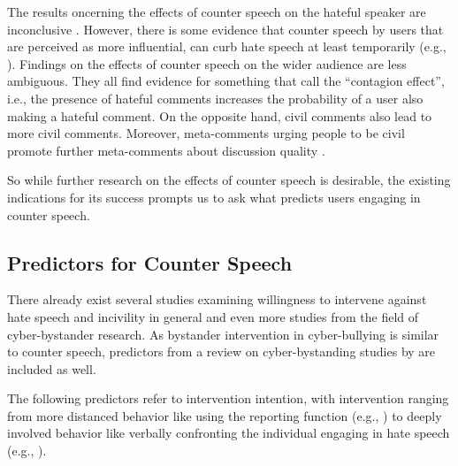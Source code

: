 \documentclass[runningheads]{llncs}
\begin{document}
The results oncerning the effects of counter speech on the hateful speaker are inconclusive \autocite{buergerCounterspeechLiteratureReview2019}. However, there is some evidence that counter speech by users that are perceived as more influential, can curb hate speech at least temporarily (e.g., \autocite{mungerTweetmentEffectsTweeted2017}). Findings on the effects of counter speech on the wider audience are less ambiguous. They all find evidence for something that \textcite{buergerCounterspeechLiteratureReview2019} call the \enquote{contagion effect}, i.e., the presence of hateful comments increases the probability of a user also making a hateful comment. On the opposite hand, civil comments also lead to more civil comments. Moreover, meta-comments urging people to be civil promote further meta-comments about discussion quality \autocite{molinaRoleCivilityMetacommunication2018}.

So while further research on the effects of counter speech is desirable, the existing indications for its success prompts us to ask what predicts users engaging in counter speech.

\hypertarget{predictors-for-counter-speech}{%
\subsection{Predictors for Counter Speech}\label{predictors-for-counter-speech}}

There already exist several studies examining willingness to intervene against hate speech and incivility in general and even more studies from the field of cyber-bystander research. As bystander intervention in cyber-bullying is similar to counter speech, predictors from a review on cyber-bystanding studies by \textcite{lambeStandingBullyingSocial2019} are included as well.

The following predictors refer to intervention intention, with intervention ranging from more distanced behavior like using the reporting function (e.g., \autocite{wongCombatingOnlineAbuse2016}) to deeply involved behavior like verbally confronting the individual engaging in hate speech (e.g., \autocite{dickterConfrontNotConfront2013}).
\end{document}
